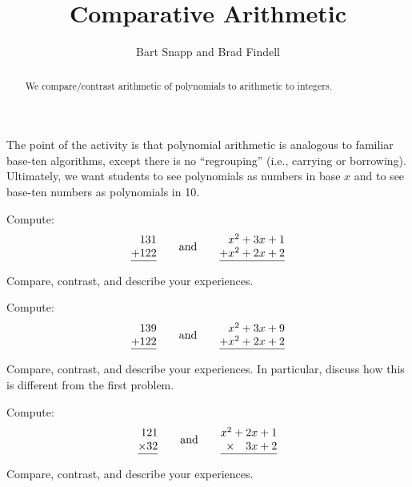 \documentclass[nooutcomes]{ximera}
\title{Comparative Arithmetic}
\author{Bart Snapp and Brad Findell}
\begin{document}
\begin{abstract}
  We compare/contrast arithmetic of polynomials to arithmetic to
  integers.
\end{abstract}
\maketitle

\label{A:CA}

\begin{teachingnote}
The point of the activity is that polynomial arithmetic is analogous to familiar base-ten algorithms, except there is no ``regrouping'' (i.e., carrying or borrowing).  Ultimately, we want students to see polynomials as numbers in base $x$ and to see base-ten numbers as polynomials in 10.
\end{teachingnote}

\begin{problem} Compute:
\[
\begin{array}{@{}r@{}}
131\\
+122\\ \hline
\end{array}
\qquad\text{and}
\qquad
\begin{array}{@{}r@{}}
x^2+3x+1\\
+x^2+2x+2\\ \hline
\end{array}
\]

\vspace{0.5in}
Compare, contrast, and describe your experiences.
\end{problem}

\begin{problem} Compute:
\[
\begin{array}{@{}r@{}}
139\\
+122\\ \hline
\end{array}
\qquad\text{and}
\qquad
\begin{array}{@{}r@{}}
x^2+3x+9\\
+x^2+2x+2\\ \hline
\end{array}
\]

\vspace{0.5in}
Compare, contrast, and describe your experiences. In particular,
discuss how this is different from the first problem.
\end{problem}


\begin{problem} Compute:
\[
\begin{array}{@{}r@{}}
121\\
\times 32\\ \hline
\end{array}
\qquad\text{and}
\qquad
\begin{array}{@{}r@{}}
x^2+2x+1\\
\times~~~3x+2\\ \hline
\end{array}
\]
\vspace{0.8in}

Compare, contrast, and describe your experiences.
\end{problem}
\end{document}
